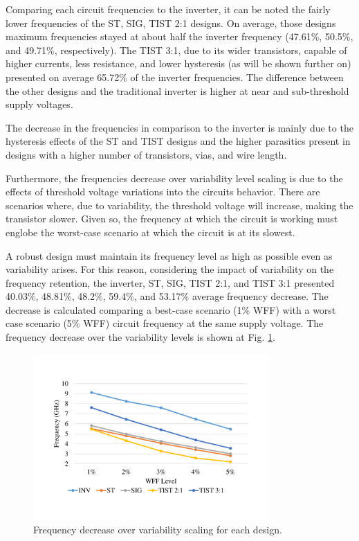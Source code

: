 \documentclass[pgmicro,mestrado,english]{iiufrgs}
\begin{document}
Comparing each circuit frequencies to the inverter, it can be noted the fairly lower frequencies of the ST, SIG, TIST 2:1 designs. On average, those designs maximum frequencies stayed at about half the inverter frequency (47.61\%, 50.5\%, and 49.71\%, respectively). The TIST 3:1, due to its wider transistors, capable of higher currents,  less resistance, and lower hysteresis (as will be shown further on) presented on average 65.72\% of the inverter frequencies. The difference between the other designs and the traditional inverter is higher at near and sub-threshold supply voltages.

The decrease in the frequencies in comparison to the inverter is mainly due to the hysteresis effects of the ST and TIST designs and the higher parasitics present in designs with a higher number of transistors, vias, and wire length.

Furthermore, the frequencies decrease over variability level scaling is due to the effects of threshold voltage variations into the circuits behavior. There are scenarios where, due to variability, the threshold voltage will increase, making the transistor slower. Given so, the frequency at which the circuit is working must englobe the worst-case scenario at which the circuit is at its slowest.

A robust design must maintain its frequency level as high as possible even as variability arises. For this reason, considering the impact of variability on the frequency retention, the inverter, ST, SIG, TIST 2:1, and TIST 3:1 presented 40.03\%, 48.81\%, 48.2\%, 59.4\%, and 53.17\% average frequency decrease. The decrease is calculated comparing a best-case scenario (1\% WFF) with a worst case scenario (5\% WFF) circuit frequency at the same supply voltage. The frequency decrease over the variability levels is shown at Fig. \ref{fig:freqRetWFF}.

\begin{figure}[]
\centering
\includegraphics[width=0.8\textwidth, trim={2cm 3cm 2cm 3cm},clip]{freqRetWFF.pdf}
\caption{Frequency decrease over variability scaling for each design.}
\label{fig:freqRetWFF}
\end{figure}
\end{document}

